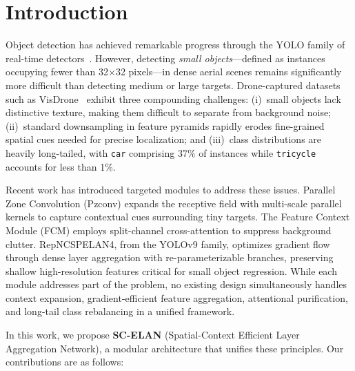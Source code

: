 \section{Introduction}

Object detection has achieved remarkable progress through the YOLO family of real-time detectors~\cite{yolov8,yolov9,yolo11}.
However, detecting \emph{small objects}---defined as instances occupying fewer than 32$\times$32 pixels---in dense aerial scenes remains significantly more difficult than detecting medium or large targets.
Drone-captured datasets such as VisDrone~\cite{visdrone} exhibit three compounding challenges:
(i)~small objects lack distinctive texture, making them difficult to separate from background noise;
(ii)~standard downsampling in feature pyramids rapidly erodes fine-grained spatial cues needed for precise localization;
and (iii)~class distributions are heavily long-tailed, with \texttt{car} comprising 37\% of instances while \texttt{tricycle} accounts for less than 1\%.

Recent work has introduced targeted modules to address these issues.
Parallel Zone Convolution (Pzconv) expands the receptive field with multi-scale parallel kernels to capture contextual cues surrounding tiny targets.
The Feature Context Module (FCM) employs split-channel cross-attention to suppress background clutter.
RepNCSPELAN4, from the YOLOv9 family, optimizes gradient flow through dense layer aggregation with re-parameterizable branches, preserving shallow high-resolution features critical for small object regression.
While each module addresses part of the problem, no existing design simultaneously handles context expansion, gradient-efficient feature aggregation, attentional purification, and long-tail class rebalancing in a unified framework.

In this work, we propose \textbf{SC-ELAN} (Spatial-Context Efficient Layer Aggregation Network), a modular architecture that unifies these principles.
Our contributions are as follows:

